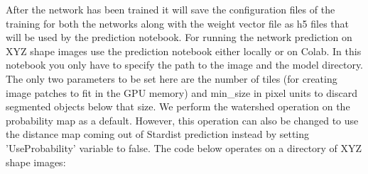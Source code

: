 \documentclass[letterpaper,compsoc,twoside]{IEEEtran}
\begin{document}
After the network has been trained it will save the configuration files of the training for both the networks along with the weight vector file as h5 files that will be used by the prediction notebook. For running the network prediction on XYZ shape images use the prediction notebook either locally or on Colab. In this notebook you only have to specify the path to the image and the model directory. The only two parameters to be set here are the number of tiles (for creating image patches to fit in the GPU memory) and min\_size in pixel units to discard segmented objects below that size. We perform the watershed operation on the probability map as a default. However, this operation can also be changed to use the distance map coming out of Stardist prediction instead by setting 'UseProbability' variable to false.
The code below operates on a directory of XYZ shape images:
\end{document}
